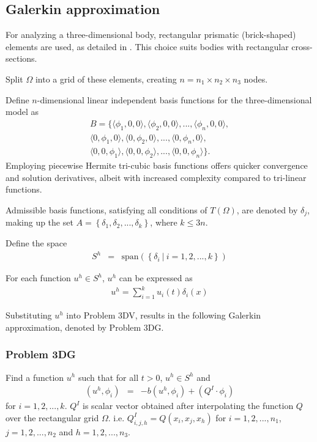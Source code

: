 	\subsection*{Galerkin approximation}
	For analyzing a three-dimensional body, rectangular prismatic (brick-shaped) elements are used, as detailed in \cite{Wu06}. This choice suits bodies with rectangular cross-sections.

	Split $\Omega$ into a grid of these elements, creating $n = n_1 \times n_2 \times n_3$ nodes.

	Define $n$-dimensional linear independent basis functions for the three-dimensional model as
	\begin{eqnarray*}
	B = \{\langle\phi_1, 0 , 0\rangle, \langle\phi_2, 0, 0\rangle,...,\langle\phi_{n}, 0, 0 \rangle,\\
		\langle 0,\phi_1 ,0 \rangle,\langle 0 ,\phi_2,0\rangle,...,\langle 0,\phi_{n},0\rangle,\\
		\langle 0,0,\phi_1 \rangle,\langle 0,0,\phi_2\rangle,...,\langle 0,0,\phi_{n}\rangle \}.
	\end{eqnarray*}
	Employing piecewise Hermite tri-cubic basis functions offers quicker convergence and solution derivatives, albeit with increased complexity compared to tri-linear functions.

	Admissible basis functions, satisfying all conditions of $T(\Omega)$, are denoted by $\delta_j$, making up the set $A = \left\{\delta_1, \delta_2,... , \delta_k\right\}$, where $k \leq 3n$.


	Define the space
	\begin{eqnarray*}
		S^h & = & \textrm{span}\left(\left\{\delta_i \ | \ i = 1,2,...,k \right\} \right)
	\end{eqnarray*}

	For each function $u^h \in S^h$, $u^h$ can be expressed as
	\begin{eqnarray*}
		u^h = \sum_{i = 1}^{k} u_i(t) \delta_{i}(x)
	\end{eqnarray*}

	Substituting $u^h$ into Problem 3DV, results in the following Galerkin approximation, denoted by Problem 3DG.

	\subsubsection*{Problem 3DG}
	Find a function $u^h$ such that for all $t>0$, $u^h \in S^h$ and
	\begin{eqnarray*}
		(u^h, \phi_i) & = & -b(u^h,\phi_i) + (Q^I \cdot \phi_i)
	\end{eqnarray*} for $i = 1,2,...,k$. $Q^I$ is scalar vector obtained after interpolating the function $Q$ over the rectangular grid $\Omega$. i.e. $Q^I_{i,j, h} = Q(x_i,x_j, x_h)$ for $i = 1,2,...,n_1$, $j = 1,2,...,n_2$ and $h = 1,2,...,n_3$.

